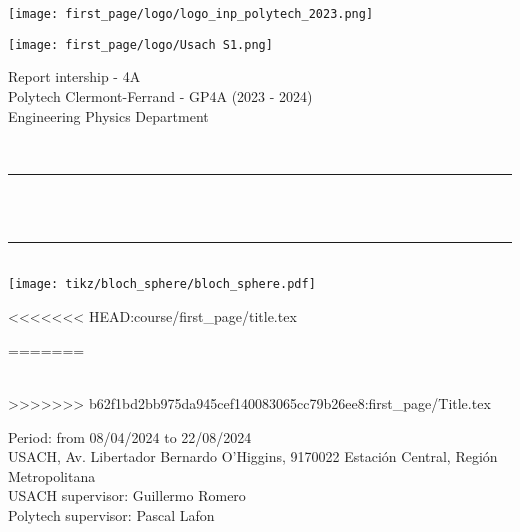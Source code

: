
\begin{titlepage}

	\begin{minipage}{0.45\textwidth}
		\centering
		\texttt{[image: first\_page/logo/logo\_inp\_polytech\_2023.png]}
	  \end{minipage}
	  \hfill
	  \begin{minipage}{0.45\textwidth}
		\centering
		\texttt{[image: first\_page/logo/Usach S1.png]}
	  \end{minipage}
	  

\begin{center}
	\Large{Report intership - 4A} \\
	\Large{Polytech Clermont-Ferrand - GP4A (2023 - 2024)}	\\
	Engineering Physics Department
\end{center}
\vspace*{-2cm}
	\newcommand{\HRule}{\rule{\linewidth}{0.5mm}}
	\centering 
	\quad\\[1.5cm]
	
	
	\makeatletter
	\HRule \\[0.35cm]
	{ \huge \bfseries \@title}\\[0.3cm] 
	\HRule \\[1cm]
	
	\texttt{[image: tikz/bloch\_sphere/bloch\_sphere.pdf]}
	

<<<<<<< HEAD:course/first_page/title.tex
	
	
	\vspace{1cm}
=======
\begin{center}
	\@author \\
	\vspace*{0.4cm}
>>>>>>> b62f1bd2bb975da945cef140083065cc79b26ee8:first_page/Title.tex

	Period: from 08/04/2024 to 22/08/2024 \\
	\vspace*{0.4cm}
	USACH,  Av. Libertador Bernardo O'Higgins, 9170022 Estación Central, Región Metropolitana \\
	\vspace*{0.4cm}
	USACH supervisor: Guillermo Romero \\
	\vspace*{0.4cm}
	Polytech supervisor:  Pascal Lafon 

\end{center}
	
	
	\vspace{2cm}
	







	
	
	
	
	
	
	
	
	
	
	\vfill 
	
\end{titlepage}

